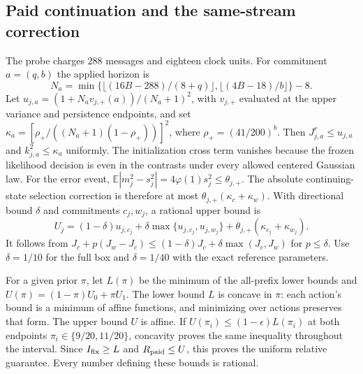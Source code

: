\subsection{Paid continuation and the same-stream correction}
The probe charges $288$ messages and eighteen clock units.
For commitment $a=(q,b)$ the applied horizon is
\[
N_a=\min\{\lfloor(16B-288)/(8+q)\rfloor,\lfloor(4B-18)/b\rfloor\}-8.
\]
Let $u_{j,a}=(1+N_av_{j,+}(a))/(N_a+1)^2$, with $v_{j,+}$ evaluated at the upper variance and persistence endpoints, and set
$\kappa_a=[\rho_+/((N_a+1)(1-\rho_+))]^2$, where $\rho_+=(41/200)^b$.
Then $J_{j,a}^r\le u_{j,a}$ and $k_{j,a}^2\le\kappa_a$ uniformly.
The initialization cross term vanishes because the frozen likelihood decision is even in the contrasts under every allowed centered Gaussian law.
For the error event, $\mathbb E|m_j^2-s_j^2|=4\varphi(1)s_j^2\le\theta_{j,+}$.
The absolute continuing-state selection correction is therefore at most $\theta_{j,+}(\kappa_c+\kappa_w)$.
With directional bound $\delta$ and commitments $c_j,w_j$, a rational upper bound is
\[
U_j=(1-\delta)u_{j,c_j}+\delta\max\{u_{j,c_j},u_{j,w_j}\}
+\theta_{j,+}(\kappa_{c_j}+\kappa_{w_j}).
\]
It follows from $J_c+p(J_w-J_c)\le(1-\delta)J_c+\delta\max(J_c,J_w)$ for $p\le\delta$.
Use $\delta=1/10$ for the full box and $\delta=1/40$ with the exact reference parameters.

For a given prior $\pi$, let $L(\pi)$ be the minimum of the all-prefix lower bounds and $U(\pi)=(1-\pi)U_0+\pi U_1$.
The lower bound $L$ is concave in $\pi$: each action's bound is a minimum of affine functions, and minimizing over actions preserves that form.
The upper bound $U$ is affine.
If $U(\pi_i)\le(1-\epsilon)L(\pi_i)$ at both endpoints $\pi_i\in\{9/20,11/20\}$, concavity proves the same inequality throughout the interval.
Since $I_{\rm fix}\ge L$ and $R_{\rm paid}\le U$, this proves the uniform relative guarantee.
Every number defining these bounds is rational.

